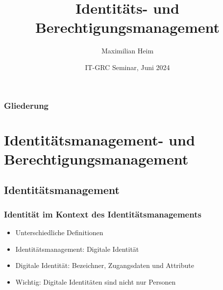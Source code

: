 \documentclass[11pt]{beamer}
\author{Maximilian Heim\inst{1}}
\institute[HS-AS]
{
  \inst{1}
  Hochschule Albstadt-Sigmaringen
}
\title{Identitäts- und Berechtigungsmanagement}
\date[IT-GRC 2024]{IT-GRC Seminar, Juni 2024}
\begin{document}
\frame{\titlepage}
\begin{frame}
  \frametitle{Gliederung}
  \tableofcontents
\end{frame}
\section{Identitätsmanagement- und Berechtigungsmanagement}
\subsection{Identitätsmanagement}
\begin{frame}
  \frametitle{Identität im Kontext des Identitätsmanagements}
  \begin{itemize}
    \item Unterschiedliche Definitionen
    \item Identitätsmanagement: Digitale Identität
    \item Digitale Identität: Bezeichner, Zugangsdaten und Attribute
    \item Wichtig: Digitale Identitäten sind nicht nur Personen~
  \end{itemize}
\end{frame}
\end{document}
